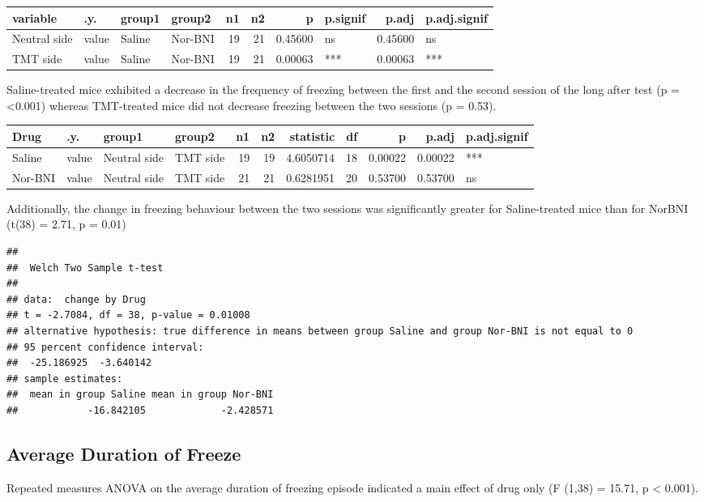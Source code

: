 \documentclass[
]{book}
\begin{document}
\begin{tabular}{l|l|l|l|r|r|r|l|r|l}
\hline
variable & .y. & group1 & group2 & n1 & n2 & p & p.signif & p.adj & p.adj.signif\\
\hline
Neutral side & value & Saline & Nor-BNI & 19 & 21 & 0.45600 & ns & 0.45600 & ns\\
\hline
TMT side & value & Saline & Nor-BNI & 19 & 21 & 0.00063 & *** & 0.00063 & ***\\
\hline
\end{tabular}

Saline-treated mice exhibited a decrease in the frequency of freezing between the first and the second session of the long after test (p = \textless0.001) whereas TMT-treated mice did not decrease freezing between the two sessions (p = 0.53).

\begin{tabular}{l|l|l|l|r|r|r|r|r|r|l}
\hline
Drug & .y. & group1 & group2 & n1 & n2 & statistic & df & p & p.adj & p.adj.signif\\
\hline
Saline & value & Neutral side & TMT side & 19 & 19 & 4.6050714 & 18 & 0.00022 & 0.00022 & ***\\
\hline
Nor-BNI & value & Neutral side & TMT side & 21 & 21 & 0.6281951 & 20 & 0.53700 & 0.53700 & ns\\
\hline
\end{tabular}

Additionally, the change in freezing behaviour between the two sessions was significantly greater for Saline-treated mice than for NorBNI (t(38) = 2.71, p = 0.01)

\begin{verbatim}
## 
##  Welch Two Sample t-test
## 
## data:  change by Drug
## t = -2.7084, df = 38, p-value = 0.01008
## alternative hypothesis: true difference in means between group Saline and group Nor-BNI is not equal to 0
## 95 percent confidence interval:
##  -25.186925  -3.640142
## sample estimates:
##  mean in group Saline mean in group Nor-BNI 
##            -16.842105             -2.428571
\end{verbatim}

\hypertarget{average-duration-of-freeze}{%
\subsection{Average Duration of Freeze}\label{average-duration-of-freeze}}

Repeated measures ANOVA on the average duration of freezing episode indicated a main effect of drug only (F (1,38) = 15.71, p \textless{} 0.001).
\end{document}

